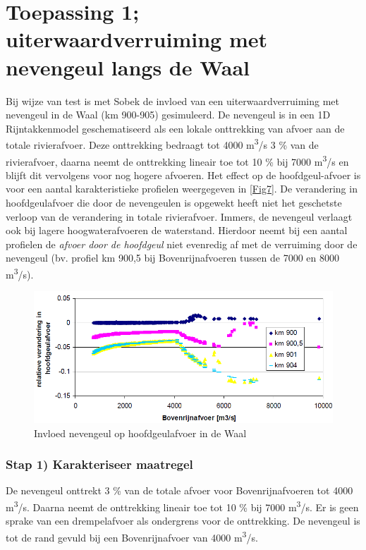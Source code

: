 \section{Toepassing 1; uiterwaardverruiming met nevengeul langs de Waal}

Bij wijze van test is met Sobek de invloed van een uiterwaardverruiming met nevengeul in de Waal (km 900-905) gesimuleerd.
De nevengeul is in een 1D Rijntakkenmodel geschematiseerd als een lokale onttrekking van afvoer aan de totale rivierafvoer.
Deze onttrekking bedraagt tot 4000 m\textsuperscript{3}/s 3 \% van de rivierafvoer, daarna neemt de onttrekking lineair toe tot 10 \% bij 7000 m\textsuperscript{3}/s en blijft dit vervolgens voor nog hogere afvoeren.
Het effect op de hoofdgeul-afvoer is voor een aantal karakteristieke profielen weergegeven in \autoref{Fig7}.
De verandering in hoofdgeulafvoer die door de nevengeulen is opgewekt heeft niet het geschetste verloop van de verandering in totale rivierafvoer.
Immers, de nevengeul verlaagt ook bij lagere hoogwaterafvoeren de waterstand.
Hierdoor neemt bij een aantal profielen de \emph{afvoer door de hoofdgeul} niet evenredig af met de verruiming door de nevengeul (bv. profiel km 900,5 bij Bovenrijnafvoeren tussen de 7000 en 8000 m\textsuperscript{3}/s).

\begin{figure}
\includegraphics[width=\columnwidth]{figures/Fig7.png}
\caption{Invloed nevengeul op hoofdgeulafvoer in de Waal}
\label{Fig7}
\end{figure}

\subsubsection*{Stap 1) Karakteriseer maatregel}

De nevengeul onttrekt 3 \% van de totale afvoer voor Bovenrijnafvoeren tot 4000 m\textsuperscript{3}/s.
Daarna neemt de onttrekking lineair toe tot 10 \% bij 7000 m\textsuperscript{3}/s.
Er is geen sprake van een drempelafvoer als ondergrens voor de onttrekking.
De nevengeul is tot de rand gevuld bij een Bovenrijnafvoer van 4000 m\textsuperscript{3}/s.

